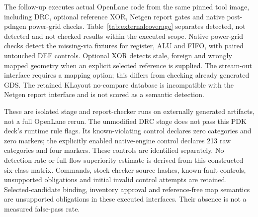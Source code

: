 The follow-up executes actual OpenLane code from the same pinned tool image,
including DRC, optional reference XOR, Netgen report gates and native
post-pdngen power-grid checks. Table~\ref{tab:externalcoverage} separates
detected, not detected and not checked results within the executed scope. Native power-grid
checks detect the missing-via fixtures for register, ALU and FIFO, with paired
untouched DEF controls. Optional XOR detects stale, foreign and wrongly mapped
geometry when an explicit selected reference is supplied. The stream-out
interface requires a mapping option; this differs from checking already
generated GDS. The retained KLayout no-compare database is incompatible with
the Netgen report interface and is not scored as a semantic detection.

These are isolated stage and report-checker runs on externally generated
artifacts, not a full OpenLane rerun. The unmodified DRC stage does not pass
this PDK deck's runtime rule flags. Its known-violating control declares zero
categories and zero markers; the explicitly enabled native-engine control
declares 213 raw categories and four markers. These controls are identified
separately. No detection-rate or full-flow superiority estimate is
derived from this constructed six-class matrix. Commands, stock checker
source hashes, known-fault controls, unsupported obligations and initial
invalid control attempts are retained.
Selected-candidate binding, inventory approval and reference-free map
semantics are unsupported obligations in these executed interfaces. Their
absence is not a measured false-pass rate.
